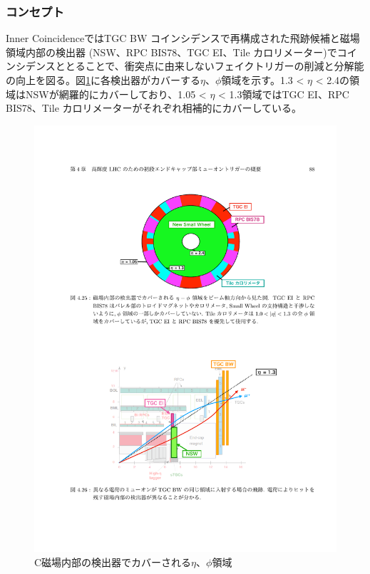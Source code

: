 \subsubsection*{コンセプト}
Inner CoincidenceではTGC BW コインシデンスで再構成された飛跡候補と磁場領域内部の検出器 (NSW、RPC BIS78、TGC EI、Tile カロリメーター)でコインシデンスととることで、衝突点に由来しないフェイクトリガーの削減と\pt 分解能の向上を図る。図\ref{SL_InnerCoin_covarage}に各検出器がカバーする$\eta$、$\phi$領域を示す。1.3 < $\eta$ < 2.4の領域はNSWが網羅的にカバーしており、1.05 < $\eta$ < 1.3領域ではTGC EI、RPC BIS78、Tile カロリメーターがそれぞれ相補的にカバーしている。
\begin{figure} 
    \centering
    \includegraphics[width=16cm]{fig/Intro/SL_InnerCoin_covarage.pdf}
    \caption[磁場内部の検出器でカバーされる$\eta$、$\phi$領域]{C磁場内部の検出器でカバーされる$\eta$、$\phi$領域\cite{mt_mino}}
    \label{SL_InnerCoin_covarage}
\end{figure}

